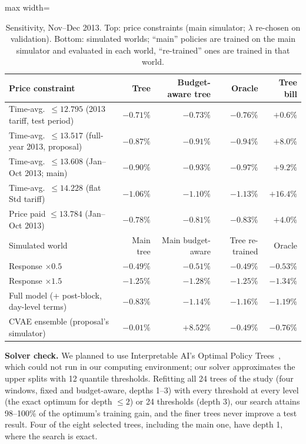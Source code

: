 \documentclass[11pt]{article}
\begin{document}
\begin{table}[t]
\centering\small
\caption{Sensitivity, Nov--Dec 2013. Top: price constraints (main simulator; $\lambda$ re-chosen on validation).
Bottom: simulated worlds; ``main'' policies are trained on the main simulator and evaluated in each world,
``re-trained'' ones are trained in that world.}
\label{tab:sens}
\begin{adjustbox}{max width=\textwidth}
\begin{tabular}{lrrrr}
\toprule
Price constraint & Tree & Budget-aware tree & Oracle & Tree bill \\
\midrule
Time-avg.\ $\le 12.795$ (2013 tariff, test period) & $-0.71\%$ & $-0.73\%$ & $-0.76\%$ & $+0.6\%$ \\
Time-avg.\ $\le 13.517$ (full-year 2013, proposal) & $-0.87\%$ & $-0.91\%$ & $-0.94\%$ & $+8.0\%$ \\
Time-avg.\ $\le 13.608$ (Jan--Oct 2013; main) & $-0.90\%$ & $-0.93\%$ & $-0.97\%$ & $+9.2\%$ \\
Time-avg.\ $\le 14.228$ (flat Std tariff) & $-1.06\%$ & $-1.10\%$ & $-1.13\%$ & $+16.4\%$ \\
Price paid $\le 13.784$ (Jan--Oct 2013) & $-0.78\%$ & $-0.81\%$ & $-0.83\%$ & $+4.0\%$ \\
\midrule
Simulated world & Main tree & Main budget-aware & Tree re-trained & Oracle \\
\midrule
Response $\times 0.5$ & $-0.49\%$ & $-0.51\%$ & $-0.49\%$ & $-0.53\%$ \\
Response $\times 1.5$ & $-1.25\%$ & $-1.28\%$ & $-1.25\%$ & $-1.34\%$ \\
Full model (+ post-block, day-level terms) & $-0.83\%$ & $-1.14\%$ & $-1.16\%$ & $-1.19\%$ \\
CVAE ensemble (proposal's simulator) & $-0.01\%$ & $+8.52\%$ & $-0.49\%$ & $-0.76\%$ \\
\bottomrule
\end{tabular}
\end{adjustbox}
\end{table}

\textbf{Solver check.} We planned to use Interpretable AI's Optimal Policy Trees~\cite{amram2022}, which could not run
in our computing environment; our solver approximates the upper splits with 12 quantile thresholds. Refitting all 24
trees of the study (four windows, fixed and budget-aware, depths 1--3) with every threshold at every level (the exact
optimum for depth $\le 2$) or 24 thresholds (depth 3), our search attains 98--100\% of the optimum's training gain, and
the finer trees never improve a test result. Four of the eight selected trees, including the main one, have depth 1,
where the search is exact.
\end{document}
